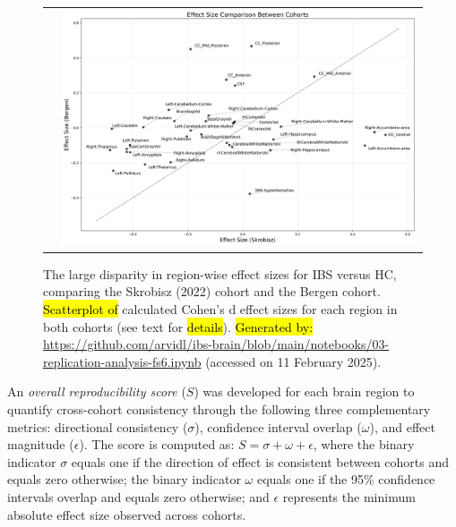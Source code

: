 \documentclass[diagnostics,article,accept,pdftex,moreauthors]{Definitions/mdpi}
\begin{document}
\begin{figure}[H]
\begin{tabular}{ll}
\hspace{-10mm} & \includegraphics[width=1\textwidth]{figs/effect_size_comparison.png}
\end{tabular}
\caption{{{The large disparity in region-wise effect sizes for IBS versus HC, comparing the Skrobisz (2022) cohort and the Bergen cohort}}. \hl{Scatterplot of} %
 calculated Cohen's d effect sizes for each region in both cohorts (see text for \hl{details}). %
{\hl{Generated by:} {{\url{https://github.com/arvidl/ibs-brain/blob/main/notebooks/03-replication-analysis-fs6.ipynb}}}} (accessed on 11 February 2025).}
\label{fig:Effect_Size_Comparison_Between_Cohorts_03-notebook}
\end{figure} 



An \textit{overall reproducibility score} ($S$) was developed for each brain region to quantify cross-cohort consistency through the following three complementary metrics: directional consistency ($\sigma$), confidence interval overlap ($\omega$), and effect magnitude ($\epsilon$). The score is computed as: $S = \sigma + \omega + \epsilon$, where the binary indicator $\sigma$ equals one if the direction of effect is consistent between cohorts and equals zero otherwise; the binary indicator $\omega$ equals one if the 95\% confidence intervals overlap and equals zero otherwise; and $\epsilon$ represents the minimum absolute effect size observed across cohorts.
\end{document}
